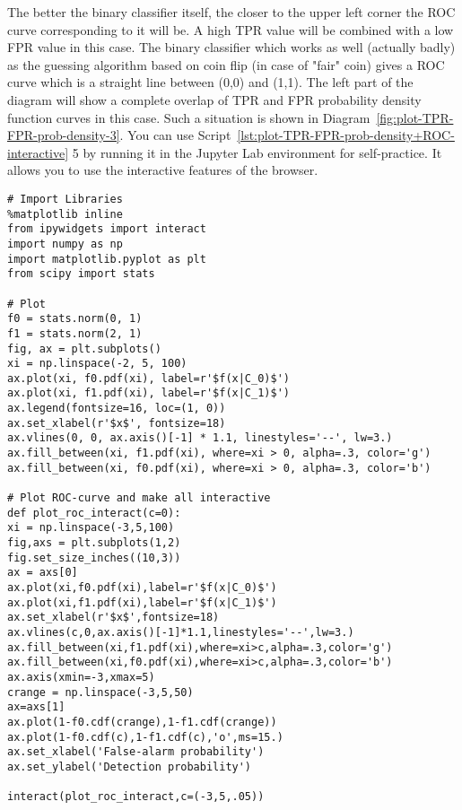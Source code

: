 \documentclass[]{scrreprt}
\begin{document}
The better the binary classifier itself, the closer to the upper left corner the ROC curve corresponding to it will be. A high TPR value will be combined with a low FPR value in this case. The binary classifier which works as well (actually badly) as the guessing algorithm based on coin flip  (in case of "fair" coin) gives a ROC curve which is a straight line between (0,0) and (1,1). The left part of the diagram will show a complete overlap of TPR and FPR probability density function curves in this case. Such a situation is shown in Diagram~\ref{fig:plot-TPR-FPR-prob-density-3}. You can use Script~\ref{lst:plot-TPR-FPR-prob-density+ROC-interactive} 5 by running it in the Jupyter Lab environment for self-practice. It allows you to use the interactive features of the browser.
%
\begin{lstlisting}[float=htp, caption = Build an~interactive graph of~TPR and FPR distribution density and its corresponding ROC curve for a given threshold value, firstnumber=1, label= lst:plot-TPR-FPR-prob-density+ROC-interactive]
# Import Libraries
%matplotlib inline
from ipywidgets import interact
import numpy as np
import matplotlib.pyplot as plt
from scipy import stats

# Plot
f0 = stats.norm(0, 1)
f1 = stats.norm(2, 1)
fig, ax = plt.subplots()
xi = np.linspace(-2, 5, 100)
ax.plot(xi, f0.pdf(xi), label=r'$f(x|C_0)$')
ax.plot(xi, f1.pdf(xi), label=r'$f(x|C_1)$')
ax.legend(fontsize=16, loc=(1, 0))
ax.set_xlabel(r'$x$', fontsize=18)
ax.vlines(0, 0, ax.axis()[-1] * 1.1, linestyles='--', lw=3.)
ax.fill_between(xi, f1.pdf(xi), where=xi > 0, alpha=.3, color='g')
ax.fill_between(xi, f0.pdf(xi), where=xi > 0, alpha=.3, color='b')

# Plot ROC-curve and make all interactive
def plot_roc_interact(c=0):
xi = np.linspace(-3,5,100)
fig,axs = plt.subplots(1,2)
fig.set_size_inches((10,3))
ax = axs[0]
ax.plot(xi,f0.pdf(xi),label=r'$f(x|C_0)$')
ax.plot(xi,f1.pdf(xi),label=r'$f(x|C_1)$')
ax.set_xlabel(r'$x$',fontsize=18)
ax.vlines(c,0,ax.axis()[-1]*1.1,linestyles='--',lw=3.)
ax.fill_between(xi,f1.pdf(xi),where=xi>c,alpha=.3,color='g')
ax.fill_between(xi,f0.pdf(xi),where=xi>c,alpha=.3,color='b')
ax.axis(xmin=-3,xmax=5)
crange = np.linspace(-3,5,50)
ax=axs[1]
ax.plot(1-f0.cdf(crange),1-f1.cdf(crange))
ax.plot(1-f0.cdf(c),1-f1.cdf(c),'o',ms=15.)
ax.set_xlabel('False-alarm probability')
ax.set_ylabel('Detection probability')

interact(plot_roc_interact,c=(-3,5,.05))

\end{lstlisting}
\end{document}
